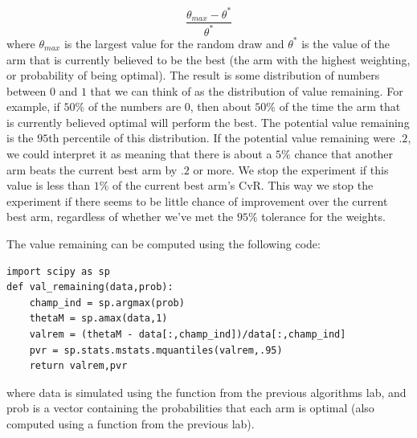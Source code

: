 \begin{equation}\label{valrem}
\frac{\theta_{max} - \theta^*}{\theta^*}
\end{equation}
where $\theta_{max}$ is the largest value for the random draw and $\theta^*$ is the value of the arm that is currently believed to be the best (the arm with the highest weighting, or probability of being optimal).  The result is some distribution of numbers between $0$ and $1$ that we can think of as the distribution of value remaining.  For example, if $50\%$ of the numbers are 0, then about $50\%$ of the time the arm that is currently believed optimal will perform the best.  The potential value remaining is the $95$th percentile of this distribution.  If the potential value remaining were $.2$, we could interpret it as meaning that there is about a $5\%$ chance that another arm beats the current best arm by $.2$ or more.  We stop the experiment if this value is less than $1\%$ of the current best arm's CvR.  This way we stop the experiment if there seems to be little chance of improvement over the current best arm, regardless of whether we've met the $95\%$ tolerance for the weights.

The value remaining can be computed using the following code:

\begin{lstlisting}[style = python]
import scipy as sp
def val_remaining(data,prob):
    champ_ind = sp.argmax(prob)
    thetaM = sp.amax(data,1)
    valrem = (thetaM - data[:,champ_ind])/data[:,champ_ind]
    pvr = sp.stats.mstats.mquantiles(valrem,.95)
    return valrem,pvr
\end{lstlisting}
where data is simulated using the  function from the previous algorithms lab, and prob is a vector containing the probabilities that each arm is optimal (also computed using a function from the previous lab).

